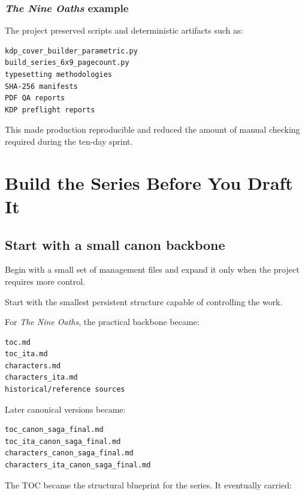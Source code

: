 \documentclass[11pt,oneside,openany]{book}
\begin{document}
\section{\texorpdfstring{\emph{The Nine Oaths} example}{The Nine Oaths example}}\label{the-nine-oaths-example-1}

The project preserved scripts and deterministic artifacts such as:

\begin{lstlisting}
kdp_cover_builder_parametric.py
build_series_6x9_pagecount.py
typesetting methodologies
SHA-256 manifests
PDF QA reports
KDP preflight reports
\end{lstlisting}

This made production reproducible and reduced the amount of manual checking required during the ten-day sprint.

\part{Build the Series Before You Draft It}

\chapter{Start with a small canon backbone}\label{start-with-a-small-canon-backbone}

Begin with a small set of management files and expand it only when the project requires more control.

Start with the smallest persistent structure capable of controlling the work.

For \emph{The Nine Oaths}, the practical backbone became:

\begin{lstlisting}
toc.md
toc_ita.md
characters.md
characters_ita.md
historical/reference sources
\end{lstlisting}

Later canonical versions became:

\begin{lstlisting}
toc_canon_saga_final.md
toc_ita_canon_saga_final.md
characters_canon_saga_final.md
characters_ita_canon_saga_final.md
\end{lstlisting}

The TOC became the structural blueprint for the series. It eventually carried:
\end{document}
